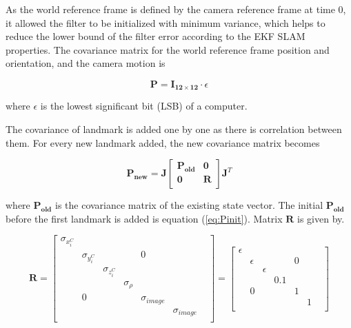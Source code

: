 As the world reference frame is defined by the camera reference frame
at time 0, it allowed the filter to be initialized with minimum
variance, which helps to reduce the lower bound of the filter error
according to the EKF SLAM properties. The covariance matrix for the
world reference frame position and orientation, and the camera motion is

\begin{equation}
\label{eq:Pinit}
\mathbf{P}=\mathbf{I_{12\times 12}}\cdot \epsilon 
\end{equation}

\noindent where $\epsilon $ is the lowest significant bit (LSB) of a
computer.

The covariance of landmark is added one by one as there is 
correlation between them. For every new landmark added, the new 
covariance matrix becomes

\begin{equation}
\label{eq:Pnew}
\mathbf{P_{new}}=\mathbf{J}\begin{bmatrix}
\mathbf{P_{old}} & \mathbf{0} \\
\mathbf{0} & \mathbf{R} \\
\end{bmatrix}
\mathbf{J}^{T}
\end{equation}

\noindent where $\mathbf{P_{old}}$ is the covariance matrix of the existing
state vector. The initial $\mathbf{P_{old}}$ before the first landmark is
added is equation (\ref{eq:Pinit}). Matrix $\mathbf{R}$ is given by.

\begin{equation}
\label{eq:R}
\mathbf{R}=\begin{bmatrix}
\sigma _{x_{i}^{C}} & & & & & & \\
 & \sigma _{y_{i}^{C}} & & & 0 & & \\
 & & \sigma _{z_{i}^{C}} & & & & \\
 & & & \sigma _{\rho } & & & \\
 & 0 & & & \sigma _{image} & & \\
 & & & & & \sigma _{image} & \\
\end{bmatrix}
 = \begin{bmatrix}
\epsilon & & & & & & \\
 & \epsilon & & & 0 & & \\
 & & \epsilon & & & & \\
 & & & 0.1 & & & \\
 & 0 & & & 1 & & \\
 & & & & & 1 & \\
\end{bmatrix} 
\end{equation}

